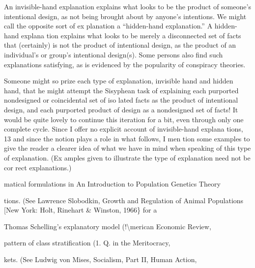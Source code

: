 \documentclass[11pt,openany]{book}
\begin{document}
An invisible-hand explanation explains what looks to be the product of someone's intentional design, as not being brought about by anyone's intentions. We might call the opposite sort of ex planation a ``hidden-hand explanation.'' A hidden-hand explana tion explains what looks to be merely a disconnected set of facts that (certainly) is not the product of intentional design, as the product of an individual's or group's intentional design(s). Some persons also find such explanations satisfying, as is evidenced by the popularity of conspiracy theories. 

Someone might so prize each type of explanation, invisible hand and hidden hand, that he might attempt the Sisyphean task of explaining each purported nondesigned or coincidental set of iso lated facts as the product of intentional design, and each purported product of design as a nondesigned set of facts! It would be quite lovely to continue this iteration for a bit, even through only one complete cycle. Since I offer no explicit account of invisible-hand explana tions, 13 and since the notion plays a role in what follows, I men tion some examples to give the reader a clearer idea of what we have in mind when speaking of this type of explanation. (Ex amples given to illustrate the type of explanation need not be cor rect explanations.) 

matical formulations in An Introduction to Population Genetics Theory 

tions. (See Lawrence Slobodkin, Growth and Regulation of Animal Populations [New York: Holt, Rinehart \& Winston, 1966\} for a 

Thomas Schelling's explanatory model (!\textbackslash{}merican Economic Review, 

pattern of class stratification (1. Q. in the Meritocracy, 

kets. (See Ludwig von Mises, Socialism, Part II, Human Action, 
\end{document}
